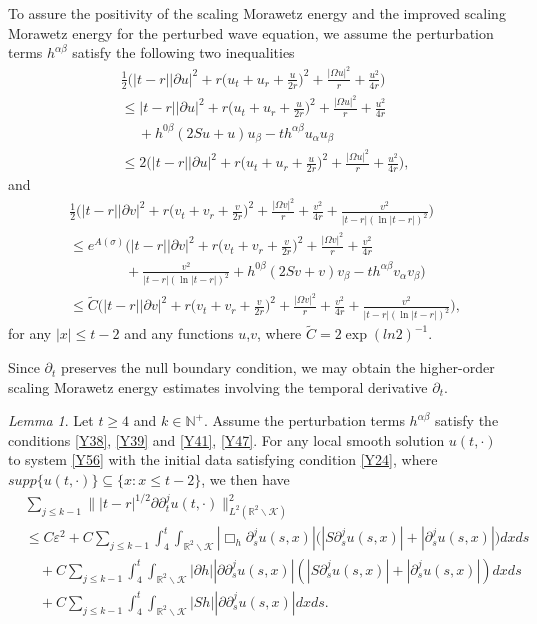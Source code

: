 \documentclass[11pt, reqno]{amsart}
\theoremstyle{definition}
\theoremstyle{remark}
\newtheorem{lem}[thm]{Lemma}
\theoremstyle{definition}
\numberwithin{equation}{section}
\numberwithin{equation}{section}
\def\leq{\leqslant}
\def\geq{\geqslant}
\begin{document}
To assure the positivity of the scaling Morawetz energy and the
improved scaling Morawetz energy for the perturbed wave equation, we
assume the perturbation terms $h^{\alpha\beta}$ satisfy the
following two inequalities 
\begin{align}\label{Y41}
&\frac12\Big(|t-r||\partial u|^2+r\Big(u_t+u_r+\frac
u{2r}\Big)^2+\frac{|\Omega
u|^2}r+\frac {u^2}{4r}\Big)\nonumber\\&\leq |t-r||\partial u|^2+r\Big(u_t+u_r+\frac
u{2r}\Big)^2+\frac{|\Omega
u|^2}r+\frac {u^2}{4r}\nonumber\\&\quad\ +h^{0\beta}(2Su+u)u_{\beta}-th^{\alpha\beta}u_{\alpha}u_{\beta}
\nonumber\\&\leq2\Big(|t-r||\partial u|^2+r\Big(u_t+u_r+\frac
u{2r}\Big)^2+\frac{|\Omega
u|^2}r+\frac {u^2}{4r}\Big),
\end{align}
and
\begin{align}\label{Y47}
&\frac12\Big(|t-r||\partial v|^2+r\Big(v_t+v_r+\frac
v{2r}\Big)^2+\frac{|\Omega v|^2}r+\frac
{v^2}{4r}+\frac{v^2}{|t-r|(\ln|t-r|)^2}\Big) \nonumber\\&\leq
e^{A(\sigma)}\Big(|t-r||\partial v|^2+r\Big(v_t+v_r+\frac
v{2r}\Big)^2+\frac{|\Omega v|^2}r+\frac
{v^2}{4r}\nonumber\\&\qquad\qquad
+\frac{v^2}{|t-r|(\ln|t-r|)^2}+h^{0\beta}(2Sv+v)v_{\beta}-th^{\alpha\beta}v_{\alpha}v_{\beta}\Big)
\nonumber\\&\leq \widetilde{C}\Big(|t-r||\partial
v|^2+r\Big(v_t+v_r+\frac v{2r}\Big)^2+\frac{|\Omega v|^2}r+\frac
{v^2}{4r}+\frac{v^2}{|t-r|(\ln|t-r|)^2}\Big),
\end{align}
for any $|x|\leq t-2$ and any functions $u$,$v$, where
$\widetilde{C}=2\exp{(ln2)^{-1}}$.
\par Since $\partial_t$ preserves the null boundary condition, we may obtain the
higher-order scaling Morawetz energy estimates involving the
temporal derivative $\partial_t$.
\begin{lem}\label{lem7}
Let $t\geq4$ and $k\in\mathbb{N}^{+}$. Assume the perturbation terms
$h^{\alpha\beta}$ satisfy the conditions \eqref{Y38}, \eqref{Y39}
and \eqref{Y41}, \eqref{Y47}. For any local
smooth solution $u(t,\cdot)$ to system \eqref{Y56} with the initial
data satisfying condition \eqref{Y24}, where
$supp\{u(t,\cdot)\}\subseteq\{x:x\leq t-2\}$, we then have
\begin{align}\label{Y13}
&\sum_{j\leq k-1}\||t-r|^{1/2}\partial\partial_t^j
u(t,\cdot)\|^2_{L^2(\mathbb R^2\backslash\mathcal
{K})}\nonumber\\&\leq C\varepsilon^2+C\sum_{j\leq
k-1}\int_4^t\int_{\mathbb R^2\backslash\mathcal
{K}}|\Box_h\partial_s^ju(s,x)|\big(|S\partial_s^ju(s,x)|+|\partial_s^ju(s,x)|\big)dxds
\nonumber\\&\quad+C\sum_{j\leq k-1}\int_4^t\int_{\mathbb
R^2\backslash\mathcal {K}}|\partial
h||\partial\partial_s^ju(s,x)|(|S\partial_s^ju(s,x)|+|\partial_s^ju(s,x)|)dxds
\nonumber\\&\quad+C\sum_{j\leq k-1}\int_4^t\int_{\mathbb
R^2\backslash\mathcal {K}}|Sh||\partial\partial_s^ju(s,x)|dxds.
\end{align}
\end{lem}
\end{document}
